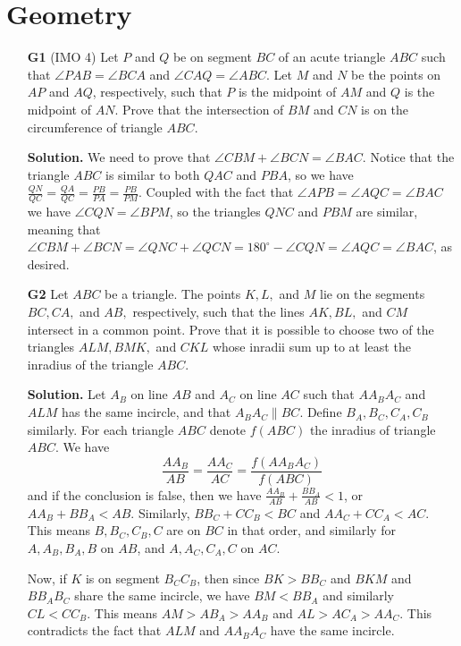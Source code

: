 \documentclass[11pt,a4paper]{article}
\begin{document}
\section*{Geometry}
\begin{enumerate}
	\item [\textbf{G1}] (IMO 4) Let $P$ and $Q$ be on segment $BC$ of an acute triangle $ABC$ such that $\angle PAB=\angle BCA$ and $\angle CAQ=\angle ABC$. Let $M$ and $N$ be the points on $AP$ and $AQ$, respectively, such that $P$ is the midpoint of $AM$ and $Q$ is the midpoint of $AN$. Prove that the intersection of $BM$ and $CN$ is on the circumference of triangle $ABC$.
	
	\textbf{Solution.} We need to prove that $\angle CBM + \angle BCN = \angle BAC$. 
	Notice that the triangle $ABC$ is similar to both $QAC$ and $PBA$, so we have $\frac{QN}{QC}=\frac{QA}{QC}=\frac{PB}{PA}=\frac{PB}{PM}$. 
	Coupled with the fact that $\angle APB = \angle AQC = \angle BAC$ we have $\angle CQN = \angle BPM$, so the triangles $QNC$ and $PBM$ are similar, meaning that $\angle CBM + \angle BCN = \angle QNC + \angle QCN = 180^{\circ} - \angle CQN = \angle AQC = \angle BAC$, as desired. 
	
	\item [\textbf{G2}] Let $ABC$ be a triangle. The points $K, L,$ and $M$ lie on the segments $BC, CA,$ and $AB,$ respectively, such that the lines $AK, BL,$ and $CM$ intersect in a common point. Prove that it is possible to choose two of the triangles $ALM, BMK,$ and $CKL$ whose inradii sum up to at least the inradius of the triangle $ABC$.
	
	\textbf{Solution.} Let $A_B$ on line $AB$ and $A_C$ on line $AC$ such that $AA_BA_C$ and $ALM$ has the same incircle, and that $A_BA_C\parallel BC$. Define $B_A, B_C, C_A, C_B$ similarly. For each triangle $ABC$ denote $f(ABC)$ the inradius of triangle $ABC$. We have 
	\[
	\frac{AA_B}{AB}=\frac{AA_C}{AC}=\frac{f(AA_BA_C)}{f(ABC)}
	\]
	and if the conclusion is false, then we have $\frac{AA_B}{AB}+\frac{BB_A}{AB} < 1$, or $AA_B+BB_A<AB$. Similarly, $BB_C+CC_B<BC$ and $AA_C+CC_A<AC$. This means $B, B_C, C_B, C$ are on $BC$ in that order, and similarly for $A, A_B, B_A, B$ on $AB$, and $A, A_C, C_A, C$ on $AC$. 
	
	Now, if $K$ is on segment $B_CC_B$, then since $BK>BB_C$ and $BKM$ and $BB_AB_C$ share the same incircle, we have $BM < BB_A$ and similarly $CL < CC_B$. This means $AM > AB_A > AA_B$ and $AL > AC_A > AA_C$. This contradicts the fact that $ALM$ and $AA_BA_C$ have the same incircle. 
	

\end{enumerate}
\end{document}

